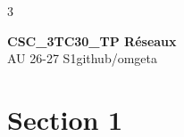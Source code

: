 \documentclass[12pt, a4paper]{article}
\newcommand{\mytitle}{CSC\_3TC30\_TP Réseaux}
\newcommand{\myauthor}{github/omgeta}
\newcommand{\mydate}{AU 26-27 S1}
\begin{document}
\raggedright
\footnotesize
\begin{multicols*}{3}
\setlength{\premulticols}{1pt}
\setlength{\postmulticols}{1pt}
\setlength{\multicolsep}{1pt}
\setlength{\columnsep}{2pt}

{\normalsize{\textbf{\mytitle}}}\\
{\footnotesize{\mydate\hspace{2pt}\textemdash\hspace{2pt}\myauthor}}
\section{Section 1}
\end{multicols*}
\end{document}
